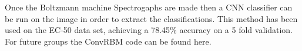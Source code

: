 Once the Boltzmann machine Spectrogaphs are made then a CNN classifier can be run on the image in order to extract the classifications. This method has been used on the EC-50\cite{EC50} data set, achieving a 78.45\% accuracy on a 5 fold validation. For future groups the ConvRBM code can be found here.\cite{ConvRBM}